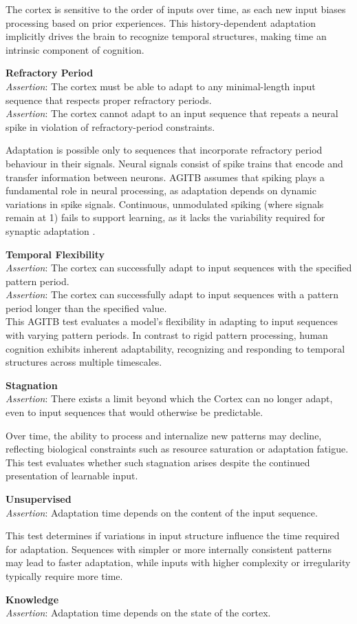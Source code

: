 \documentclass{article}
\newcommand{\agitbtest}[2]{
 \item \textbf{#1} \\
 #2
}
\begin{document}
\begin{agitblist}
{The cortex is sensitive to the order of inputs over time, as each new input biases processing based on prior experiences. This history-dependent adaptation implicitly drives the brain to recognize temporal structures, making time an intrinsic component of cognition.
}
\agitbtest{Refractory Period}{
\emph{Assertion}: The cortex must be able to adapt to any minimal-length input sequence that respects proper refractory periods.\\
\emph{Assertion}: The cortex cannot adapt to an input sequence that repeats a neural spike in violation of refractory-period constraints.

Adaptation is possible only to sequences that incorporate refractory period behaviour in their signals. Neural signals consist of spike trains that encode and transfer information between neurons. AGITB assumes that spiking plays a fundamental role in neural processing, as adaptation depends on dynamic variations in spike signals. Continuous, unmodulated spiking (where signals remain at 1) fails to support learning, as it lacks the variability required for synaptic adaptation \cite{Gerstner2002}. 
}
\agitbtest{Temporal Flexibility}{
\emph{Assertion}:  The cortex can successfully adapt to input sequences with the specified pattern period.\\
\emph{Assertion}: The cortex can successfully adapt to input sequences with a pattern period longer than the specified value.\\

This AGITB test evaluates a model’s flexibility in adapting to input sequences with varying pattern periods. In contrast to rigid pattern processing, human cognition exhibits inherent adaptability, recognizing and responding to temporal structures across multiple timescales.
}
\agitbtest{Stagnation}{
\emph{Assertion}: There exists a limit beyond which the Cortex can no longer adapt, even to input sequences that would otherwise be predictable.

Over time, the ability to process and internalize new patterns may decline, reflecting biological constraints such as resource saturation or adaptation fatigue. This test evaluates whether such stagnation arises despite the continued presentation of learnable input.
}
\agitbtest{Unsupervised}{
\emph{Assertion}: Adaptation time depends on the content of the input sequence.

This test determines if variations in input structure influence the time required for adaptation. Sequences with simpler or more internally consistent patterns may lead to faster adaptation, while inputs with higher complexity or irregularity typically require more time. 
}
\agitbtest{Knowledge}{
\emph{Assertion}: Adaptation time depends on the state of the cortex.

}
\end{agitblist}
\end{document}
